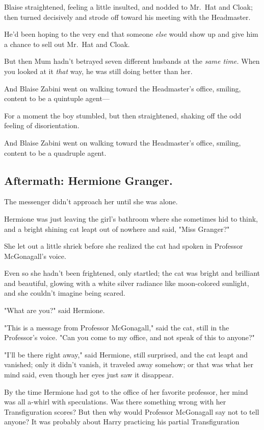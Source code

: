 Blaise straightened, feeling a little insulted, and nodded to Mr.~Hat and
Cloak; then turned decisively and strode off toward his meeting with the
Headmaster.

He'd been hoping to the very end that someone \emph{else} would show up and
give him a chance to sell out Mr.~Hat and Cloak.

But then Mum hadn't betrayed seven different husbands at the \emph{same time.}
When you looked at it \emph{that} way, he was still doing better than her.

And Blaise Zabini went on walking toward the Headmaster's office, smiling,
content to be a quintuple agent—

For a moment the boy stumbled, but then straightened, shaking off the odd
feeling of disorientation.

And Blaise Zabini went on walking toward the Headmaster's office, smiling,
content to be a quadruple agent.
\sbreak
\vspace{-2\baselineskip}
\subsection{Aftermath: Hermione Granger.}

The messenger didn't approach her until she was alone.

Hermione was just leaving the girl's bathroom where she sometimes hid to think,
and a bright shining cat leapt out of nowhere and said, "Miss Granger?"

She let out a little shriek before she realized the cat had spoken in Professor
McGonagall's voice.

Even so she hadn't been frightened, only startled; the cat was bright and
brilliant and beautiful, glowing with a white silver radiance like moon-colored
sunlight, and she couldn't imagine being scared.

"What are you?" said Hermione.

"This is a message from Professor McGonagall," said the cat, still in the
Professor's voice. "Can you come to my office, and not speak of this to anyone?"

"I'll be there right away," said Hermione, still surprised, and the cat leapt
and vanished; only it didn't vanish, it traveled away somehow; or that was what
her mind said, even though her eyes just saw it disappear.

By the time Hermione had got to the office of her favorite professor, her mind
was all a-whirl with speculations. Was there something wrong with her
Transfiguration scores? But then why would Professor McGonagall say not to tell
anyone? It was probably about Harry practicing his partial
Transfiguration{\el}

